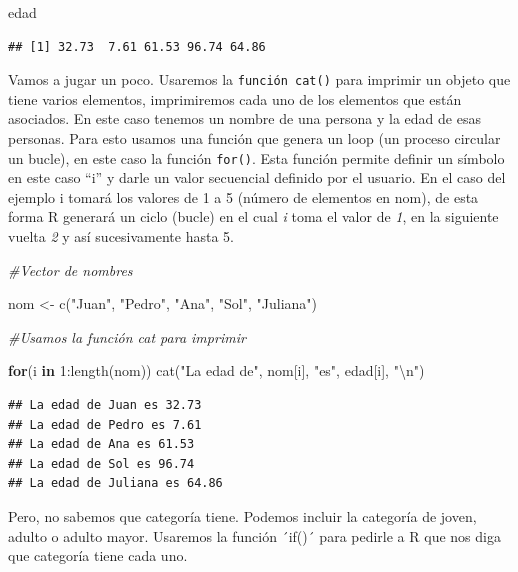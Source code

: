 \documentclass[
]{article}
\newenvironment{Shaded}{\begin{snugshade}}{\end{snugshade}}
\newcommand{\CommentTok}[1]{\textcolor[rgb]{0.56,0.35,0.01}{\textit{#1}}}
\newcommand{\ControlFlowTok}[1]{\textcolor[rgb]{0.13,0.29,0.53}{\textbf{#1}}}
\newcommand{\DecValTok}[1]{\textcolor[rgb]{0.00,0.00,0.81}{#1}}
\newcommand{\FunctionTok}[1]{\textcolor[rgb]{0.00,0.00,0.00}{#1}}
\newcommand{\NormalTok}[1]{#1}
\newcommand{\OtherTok}[1]{\textcolor[rgb]{0.56,0.35,0.01}{#1}}
\newcommand{\SpecialCharTok}[1]{\textcolor[rgb]{0.00,0.00,0.00}{#1}}
\newcommand{\StringTok}[1]{\textcolor[rgb]{0.31,0.60,0.02}{#1}}
\begin{document}
\begin{Shaded}
\begin{Highlighting}[]
\NormalTok{edad}
\end{Highlighting}
\end{Shaded}

\begin{verbatim}
## [1] 32.73  7.61 61.53 96.74 64.86
\end{verbatim}

Vamos a jugar un poco. Usaremos la \texttt{función\ cat()} para imprimir
un objeto que tiene varios elementos, imprimiremos cada uno de los
elementos que están asociados. En este caso tenemos un nombre de una
persona y la edad de esas personas. Para esto usamos una función que
genera un loop (un proceso circular un bucle), en este caso la función
\texttt{for()}. Esta función permite definir un símbolo en este caso
``i'' y darle un valor secuencial definido por el usuario. En el caso
del ejemplo i tomará los valores de 1 a 5 (número de elementos en nom),
de esta forma R generará un ciclo (bucle) en el cual \emph{i} toma el
valor de \emph{1}, en la siguiente vuelta \emph{2} y así sucesivamente
hasta 5.

\begin{Shaded}
\begin{Highlighting}[]
\CommentTok{\#Vector de nombres}

\NormalTok{nom }\OtherTok{\textless{}{-}} \FunctionTok{c}\NormalTok{(}\StringTok{"Juan"}\NormalTok{, }\StringTok{"Pedro"}\NormalTok{, }\StringTok{"Ana"}\NormalTok{, }\StringTok{"Sol"}\NormalTok{, }\StringTok{"Juliana"}\NormalTok{)}

\CommentTok{\#Usamos la función cat para imprimir}

\ControlFlowTok{for}\NormalTok{(i }\ControlFlowTok{in} \DecValTok{1}\SpecialCharTok{:}\FunctionTok{length}\NormalTok{(nom)) }\FunctionTok{cat}\NormalTok{(}\StringTok{"La edad de"}\NormalTok{, nom[i], }\StringTok{"es"}\NormalTok{, edad[i], }\StringTok{"}\SpecialCharTok{\textbackslash{}n}\StringTok{"}\NormalTok{)}
\end{Highlighting}
\end{Shaded}

\begin{verbatim}
## La edad de Juan es 32.73 
## La edad de Pedro es 7.61 
## La edad de Ana es 61.53 
## La edad de Sol es 96.74 
## La edad de Juliana es 64.86
\end{verbatim}

Pero, no sabemos que categoría tiene. Podemos incluir la categoría de
joven, adulto o adulto mayor. Usaremos la función ´if()´ para pedirle a
R que nos diga que categoría tiene cada uno.
\end{document}
